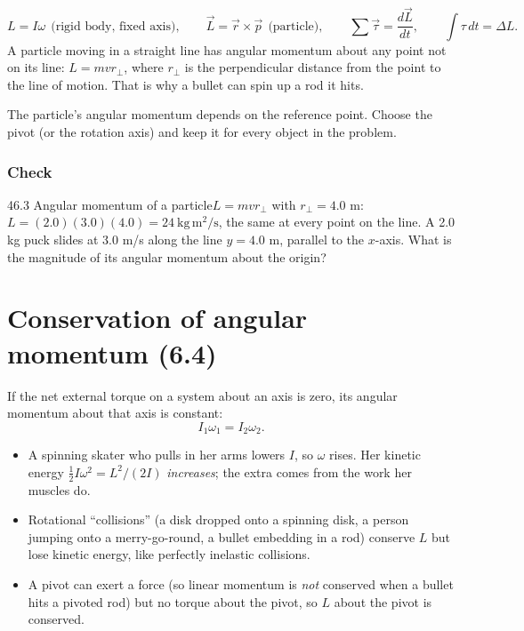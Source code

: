 \documentclass[11pt]{article}
\begin{document}
\[ L = I\omega \ \ \text{(rigid body, fixed axis)}, \qquad \vec L = \vec r\times\vec p \ \ \text{(particle)}, \qquad \sum\vec\tau = \frac{d\vec L}{dt}, \qquad \int\tau\,dt = \Delta L. \]
A particle moving in a straight line has angular momentum about any point not on its line: $L = mvr_\perp$, where $r_\perp$ is the perpendicular distance from the point to the line of motion. That is why a bullet can spin up a rod it hits.

\begin{trap}
The particle's angular momentum depends on the reference point. Choose the pivot (or the rotation axis) and keep it for every object in the problem.
\end{trap}

\subsubsection{Check}\mbox{}

\begin{q}{4}{6.3 Angular momentum of a particle}{$L = mvr_\perp$ with $r_\perp = 4.0$ m: $L = (2.0)(3.0)(4.0) = 24\ \mathrm{kg\,m^2/s}$, the same at every point on the line.}
A 2.0 kg puck slides at 3.0 m/s along the line $y = 4.0$ m, parallel to the $x$-axis. What is the magnitude of its angular momentum about the origin?
\end{q}

\section{Conservation of angular momentum (6.4)}\label{sec:3}

If the net external torque on a system about an axis is zero, its angular momentum about that axis is constant:
\[ I_1\omega_1 = I_2\omega_2. \]
\begin{itemize}
\item A spinning skater who pulls in her arms lowers $I$, so $\omega$ rises. Her kinetic energy $\tfrac12 I\omega^2 = L^2/(2I)$ \emph{increases}; the extra comes from the work her muscles do.
\item Rotational ``collisions'' (a disk dropped onto a spinning disk, a person jumping onto a merry-go-round, a bullet embedding in a rod) conserve $L$ but lose kinetic energy, like perfectly inelastic collisions.
\item A pivot can exert a force (so linear momentum is \emph{not} conserved when a bullet hits a pivoted rod) but no torque about the pivot, so $L$ about the pivot is conserved.
\end{itemize}
\end{document}
